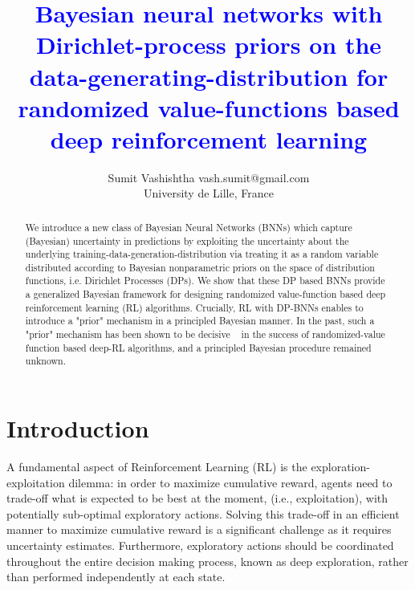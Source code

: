 \documentclass[10pt]{article}
\title{\textcolor{blue}{Bayesian neural networks with Dirichlet-process priors on the data-generating-distribution for randomized value-functions based deep reinforcement learning}}
\author{\name Sumit Vashishtha \email vash.sumit@gmail.com \\
      \addr University de Lille, France
    }
\begin{document}
{\maketitle} %

\begin{abstract}
 We introduce a new class of Bayesian Neural Networks (BNNs) which capture (Bayesian) uncertainty in predictions by exploiting the uncertainty about the underlying training-data-generation-distribution via treating it as a random variable distributed according to Bayesian nonparametric priors on the space of distribution functions, i.e. Dirichlet Processes (DPs).  We show that these DP based BNNs provide a generalized Bayesian framework for designing randomized value-function based deep reinforcement learning (RL) algorithms. Crucially, RL with DP-BNNs enables to introduce a "prior" mechanism in a principled Bayesian manner. In  the past, such a "prior" mechanism has been shown to be decisive ~\citep{osband2018randomized} in the success of randomized-value function based deep-RL algorithms, and a principled Bayesian procedure remained unknown.

\end{abstract}



\section{Introduction}

A fundamental aspect of Reinforcement Learning (RL) is the exploration-exploitation dilemma: in order
to maximize cumulative reward, agents need to trade-off what is expected to be best at the moment,
(i.e., exploitation), with potentially sub-optimal exploratory actions. Solving this trade-off in an
efficient manner to maximize cumulative reward is a significant challenge as it requires uncertainty
estimates. Furthermore, exploratory actions should be coordinated throughout the entire decision
making process, known as deep exploration, rather than performed independently at each state.
\end{document}
